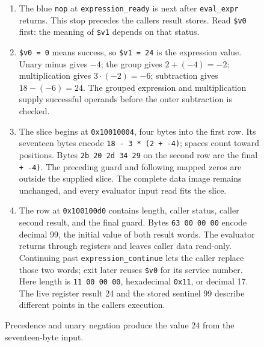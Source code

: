 \begin{figure}[htbp]
  \par\smallskip
  \begin{minipage}{\linewidth}
    \small
    \begin{enumerate}
      \setlength{\itemsep}{2pt}
            \setlength{\parsep}{0pt}
      \item The blue \texttt{nop} at \texttt{expression\_ready} is next after \texttt{eval\_expr} returns. This stop precedes the caller\textquotesingle s result stores. Read \texttt{\$v0} first: the meaning of \texttt{\$v1} depends on that status.
      \item \texttt{\$v0 = 0} means success, so \texttt{\$v1 = 24} is the expression value. Unary minus gives $-4$; the group gives $2+(-4)=-2$; multiplication gives $3\cdot(-2)=-6$; subtraction gives $18-(-6)=24$. The grouped expression and multiplication supply successful operands before the outer subtraction is checked.
      \item The slice begins at \texttt{0x10010004}, four bytes into the first row. Its seventeen bytes encode \texttt{18 - 3 * (2 + -4)}; spaces count toward positions. Bytes \texttt{2b 20 2d 34 29} on the second row are the final \texttt{+ -4)}. The preceding guard and following mapped zeros are outside the supplied slice. The complete data image remains unchanged, and every evaluator input read fits the slice.
      \item The row at \texttt{0x100100d0} contains length, caller status, caller second result, and the final guard. Bytes \texttt{63 00 00 00} encode decimal 99, the initial value of both result words. The evaluator returns through registers and leaves caller data read-only. Continuing past \texttt{expression\_continue} lets the caller replace those two words; exit later reuses \texttt{\$v0} for its service number. Here length is \texttt{11 00 00 00}, hexadecimal \texttt{0x11}, or decimal 17. The live register result 24 and the stored sentinel 99 describe different points in the caller\textquotesingle s execution.
    \end{enumerate}
  \end{minipage}
  \caption{Precedence and unary negation produce the value 24 from the seventeen-byte input.}
  \label{capture:017-expression-evaluator-f01}
  \label{expression-f01}
\end{figure}
\par
